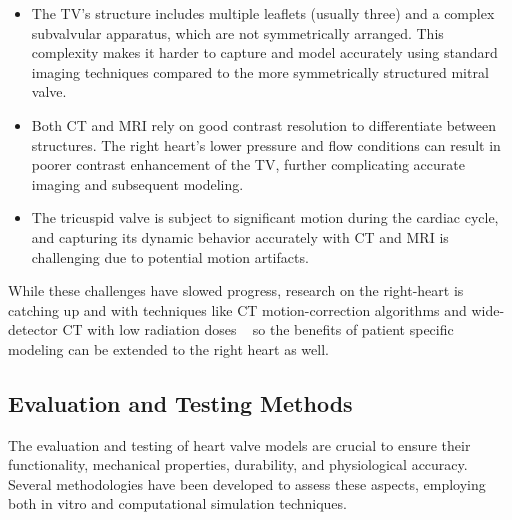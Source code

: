 \begin{itemize}
    \item The \gls{TV}'s structure includes multiple leaflets (usually three) and a complex subvalvular apparatus, which are not symmetrically arranged. This complexity makes it harder to capture and model accurately using standard imaging techniques compared to the more symmetrically structured mitral valve.

    \item Both CT and MRI rely on good contrast resolution to differentiate between structures. The right heart's lower pressure and flow conditions can result in poorer contrast enhancement of the \gls{TV}, further complicating accurate imaging and subsequent modeling.~

    \item The tricuspid valve is subject to significant motion during the cardiac cycle, and capturing its dynamic behavior accurately with CT and MRI is challenging due to potential motion artifacts.~
\end{itemize}

\mynewline
While these challenges have slowed progress, research on the right-heart is catching up and with techniques like \gls{CT} motion-correction algorithms and wide-detector \gls{CT} with low radiation doses ~ so the benefits of patient specific modeling can be extended to the right heart as well.


\subsection{Evaluation and Testing Methods}
The evaluation and testing of heart valve models are crucial to ensure their functionality, mechanical properties, durability, and physiological accuracy. Several methodologies have been developed to assess these aspects, employing both in vitro and computational simulation techniques.

